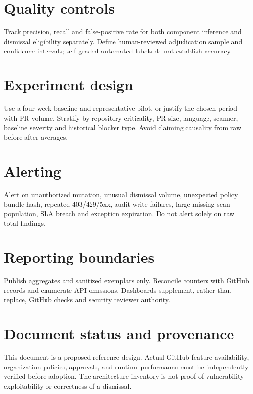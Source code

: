 \documentclass[11pt,letterpaper]{article}
\begin{document}
\section{Quality controls}
Track precision, recall and false-positive rate for both component inference and dismissal eligibility separately. Define human-reviewed adjudication sample and confidence intervals; self-graded automated labels do not establish accuracy.


\section{Experiment design}
Use a four-week baseline and representative pilot, or justify the chosen period with PR volume. Stratify by repository criticality, PR size, language, scanner, baseline severity and historical blocker type. Avoid claiming causality from raw before-after averages.


\section{Alerting}
Alert on unauthorized mutation, unusual dismissal volume, unexpected policy bundle hash, repeated 403/429/5xx, audit write failures, large missing-scan population, SLA breach and exception expiration. Do not alert solely on raw total findings.


\section{Reporting boundaries}
Publish aggregates and sanitized exemplars only. Reconcile counters with GitHub records and enumerate API omissions. Dashboards supplement, rather than replace, GitHub checks and security reviewer authority.


\section*{Document status and provenance}
This document is a proposed reference design. Actual GitHub feature availability, organization policies, approvals, and runtime performance must be independently verified before adoption. The architecture inventory is not proof of vulnerability exploitability or correctness of a dismissal.
\end{document}
